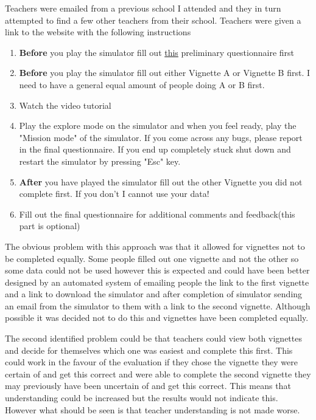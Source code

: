 Teachers were emailed from a previous school I attended and they in turn attempted to find a few other teachers from their school. Teachers were given a link to the website with the following instructions

\begin{enumerate}
\item \textbf{Before} you play the simulator fill out \underline{this} preliminary questionnaire first
\item \textbf{Before} you play the simulator fill out either Vignette A or Vignette B first. I need to have a general equal amount of people doing A or B first.
\item Watch the video tutorial
\item Play the explore mode on the simulator and when you feel ready, play the "Mission mode" of the simulator. If you come across any bugs, please report in the final questionnaire. If you end up completely stuck shut down and restart the simulator by pressing "Esc" key.
\item \textbf{After} you have played the simulator fill out the other Vignette you did not complete first. If you don't I cannot use your data!
\item Fill out the final questionnaire for additional comments and feedback(this part is optional)
\end{enumerate}

The obvious problem with this approach was that it allowed for vignettes not to be completed equally. Some people filled out one vignette and not the other so some data could not be used however this is expected and could have been better designed by an automated system of emailing people the link to the first vignette and a link to download the simulator and after completion of simulator sending an email from the simulator to them with a link to the second vignette. Although possible it was decided not to do this and vignettes have been completed equally.  

The second identified problem could be that teachers could view both vignettes and decide for themselves which one was easiest and complete this first. This could work in the favour of the evaluation if they chose the vignette they were certain of and get this correct and were able to complete the second vignette they may previously have been uncertain of and get this correct. This means that understanding could be increased but the results would not indicate this. However what should be seen is that teacher understanding is not made worse. 

